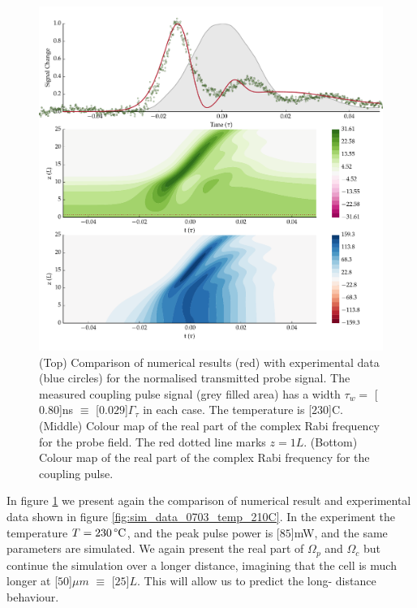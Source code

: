     \begin{figure}[h]
      \includegraphics[width=\linewidth]
        {figs/06_simultons/mb_vee2g_15c_130p_0330t_230C_sb50_120vel010_10_050um_fig1.pdf}
      \caption{
      (Top) Comparison of numerical results (red) with experimental data (blue
      circles) for the normalised transmitted probe signal. The measured coupling
      pulse signal (grey filled area) has a width $\tau_w = $ \unit[$0.80$]{ns} $
      \equiv $ \unit[$0.029$]{$\Gamma_\tau$} in each case. The temperature is
      \unit[$230$]{\textdegree C}. (Middle) Colour map of the real part of the
      complex Rabi frequency for the probe field. The red dotted line marks $z =
      1L$. (Bottom) Colour map of the real part of the complex Rabi frequency for
      the coupling pulse.
      } 
      \label{fig:exp_result_single} 
    \end{figure}

    In figure \ref{fig:exp_result_single} we present again the comparison of
    numerical result and experimental data shown in figure
    \ref{fig:sim_data_0703_temp_210C}. In the experiment the temperature $T =
    \unit[230]{\textrm{\textdegree C}}$, and the peak pulse power is
    \unit[$85$]{mW}, and the same parameters are simulated. We again present the
    real part of $\Omega_p$ and $\Omega_c$ but continue the simulation over a
    longer distance, imagining that the cell is much longer at \unit[$50$]{$\mu
    m$} $ \equiv$ \unit[$25$]{$L$}. This will allow us to predict the long-
    distance behaviour.
